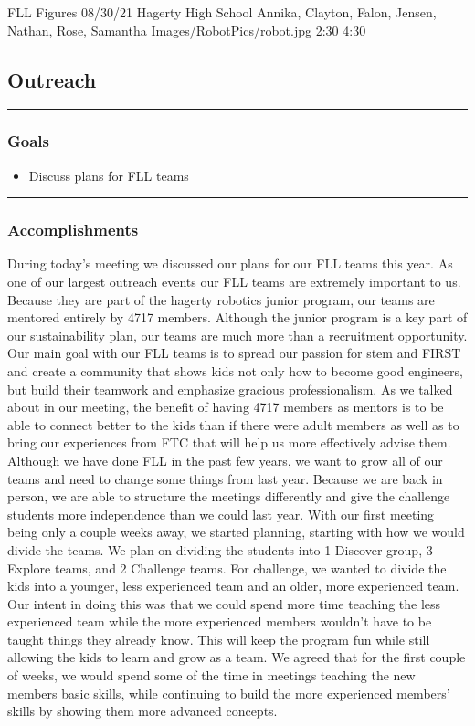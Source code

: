 \insertmeeting 
	{FLL Figures} 
	{08/30/21}
	{Hagerty High School}
	{Annika, Clayton, Falon, Jensen, Nathan, Rose, Samantha}
	{Images/RobotPics/robot.jpg}
	{2:30}
  	{4:30}
	
\subsection*{Outreach}
\noindent\hfil\rule{\textwidth}{.4pt}\hfil
\subsubsection*{Goals}
\begin{itemize}
    \item Discuss plans for FLL teams
\end{itemize} 

\noindent\hfil\rule{\textwidth}{.4pt}\hfil

\subsubsection*{Accomplishments}
During today’s meeting we discussed our plans for our FLL teams this year. As one of our largest outreach events our FLL teams are extremely important to us. Because they are part of the hagerty robotics junior program, our teams are mentored entirely by 4717 members. Although the junior program is a key part of our sustainability plan, our teams are much more than a recruitment opportunity. Our main goal with our FLL teams is to spread our passion for stem and FIRST and create a community that shows kids not only how to become good engineers, but build their teamwork and emphasize gracious professionalism. As we talked about in our meeting, the benefit of having 4717 members as mentors is to be able to connect better to the kids than if there were adult members as well as to bring our experiences from FTC that will help us more effectively advise them.
Although we have done FLL in the past few years, we want to grow all of our teams and need to change some things from last year. Because we are back in person, we are able to structure the meetings differently and give the challenge students more independence than we could last year. With our first meeting being only a couple weeks away, we started planning, starting with how we would divide the teams. We plan on dividing the students into 1 Discover group, 3 Explore teams, and 2 Challenge teams. For challenge, we wanted to divide the kids into a younger, less experienced team and an older, more experienced team. Our intent in doing this was that we could spend more time teaching the less experienced team while the more experienced members wouldn't have to be taught things they already know. This will keep the program fun while still allowing the kids to learn and grow as a team. We agreed that for the first couple of weeks, we would spend some of the time in meetings teaching the new members basic skills, while continuing to build the more experienced members’ skills by showing them more advanced concepts.

